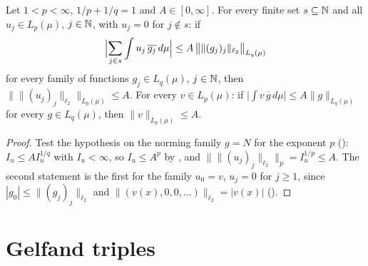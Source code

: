 \begin{theorem}
\label{thm:lp-norm-duality}
\leanok
{}
Let $1 < p < \infty$, $1/p + 1/q = 1$ and $A \in [0, \infty]$. For every finite set
$s \subseteq \mathbb{N}$ and all $u_j \in L_p(\mu)$, $j \in \mathbb{N}$, with $u_j = 0$ for $j \notin s$: if
\[
  \Bigl| \sum_{j \in s} \int u_j \, \overline{g_j} \, d\mu \Bigr|
  \leq A \, \bigl\| \|(g_j)_j\|_{\ell_2} \bigr\|_{L_q(\mu)}
\]
for every family of functions $g_j \in L_q(\mu)$, $j \in \mathbb{N}$, then
$\bigl\| \|(u_j)_j\|_{\ell_2} \bigr\|_{L_p(\mu)} \leq A$. For every $v \in L_p(\mu)$: if
$\bigl| \int v \, \overline g \, d\mu \bigr| \leq A \|g\|_{L_q(\mu)}$ for every
$g \in L_q(\mu)$, then $\|v\|_{L_p(\mu)} \leq A$.
\end{theorem}

\begin{proof}
\leanok
Test the hypothesis on the norming family $g = N$ for the exponent $p$
(): $I_u \leq A I_u^{1/q}$ with $I_u < \infty$, so $I_u \leq A^p$ by
, and
$\bigl\| \|(u_j)_j\|_{\ell_2} \bigr\|_p = I_u^{1/p} \leq A$. The second statement is the first
for the family $u_0 = v$, $u_j = 0$ for $j \geq 1$, since
$|g_0| \leq \|(g_j)_j\|_{\ell_2}$ and $\|(v(x), 0, 0, \dots)\|_{\ell_2} = |v(x)|$
().
\end{proof}

\chapter{Gelfand triples}
\label{ch:gelfand-triples}

